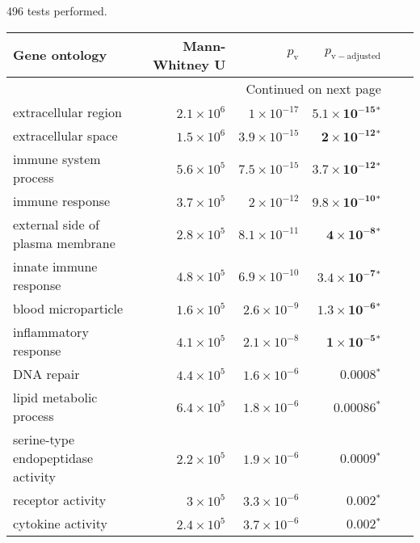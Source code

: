496 tests performed.\scriptsize
\begin{longtable}{|l|r|r|r|r|r|}
\toprule
                                     Gene ontology &     Mann-Whitney U &     $p_{\mathrm{v}}$ &      $p_{\mathrm{v-adjusted}}$ \\
\midrule
\endhead
\midrule
\multicolumn{4}{r}{{Continued on next page}} \\
\midrule
\endfoot

\bottomrule
\endlastfoot
                              extracellular region & $2.1\times 10^{6}$ &  $ 1\times 10^{-17}$ &  $\bm{5.1\times 10^{-15}{^*}}$ \\
                               extracellular space & $1.5\times 10^{6}$ & $3.9\times 10^{-15}$ &   $\bm{ 2\times 10^{-12}{^*}}$ \\
                             immune system process & $5.6\times 10^{5}$ & $7.5\times 10^{-15}$ &  $\bm{3.7\times 10^{-12}{^*}}$ \\
                                   immune response & $3.7\times 10^{5}$ &  $ 2\times 10^{-12}$ &  $\bm{9.8\times 10^{-10}{^*}}$ \\
                  external side of plasma membrane & $2.8\times 10^{5}$ & $8.1\times 10^{-11}$ &    $\bm{ 4\times 10^{-8}{^*}}$ \\
                            innate immune response & $4.8\times 10^{5}$ & $6.9\times 10^{-10}$ &   $\bm{3.4\times 10^{-7}{^*}}$ \\
                               blood microparticle & $1.6\times 10^{5}$ &  $2.6\times 10^{-9}$ &   $\bm{1.3\times 10^{-6}{^*}}$ \\
                             inflammatory response & $4.1\times 10^{5}$ &  $2.1\times 10^{-8}$ &    $\bm{ 1\times 10^{-5}{^*}}$ \\
                                        DNA repair & $4.4\times 10^{5}$ &  $1.6\times 10^{-6}$ &              $\bm{0.0008{^*}}$ \\
                           lipid metabolic process & $6.4\times 10^{5}$ &  $1.8\times 10^{-6}$ &             $\bm{0.00086{^*}}$ \\
                serine-type endopeptidase activity & $2.2\times 10^{5}$ &  $1.9\times 10^{-6}$ &              $\bm{0.0009{^*}}$ \\
                                 receptor activity &  $ 3\times 10^{5}$ &  $3.3\times 10^{-6}$ &              $\bm{ 0.002{^*}}$ \\
                                 cytokine activity & $2.4\times 10^{5}$ &  $3.7\times 10^{-6}$ &              $\bm{ 0.002{^*}}$ \\

\end{longtable}
